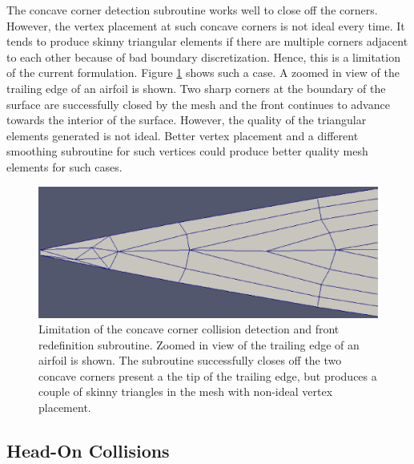 The concave corner detection subroutine  works well to close off the corners. However, the vertex placement at such concave corners is not ideal every time. It tends to produce skinny triangular elements if there are multiple corners adjacent to each other because of bad boundary discretization. Hence, this is a limitation of the current formulation. Figure \ref{fig-cornerLimitation} shows such a case. A zoomed in view of the trailing edge of an airfoil is shown. Two sharp corners at the boundary of the surface are successfully closed by the mesh and the front continues to advance towards the interior of the surface. However, the quality of the triangular elements generated is not ideal. Better vertex placement and a different smoothing subroutine for such vertices could produce better quality mesh elements for such cases.

\begin{figure}
\centering
\includegraphics[width=0.4\linewidth]{img/m2/cornerCollision/cornerLimitation.eps}
\caption{Limitation of the concave corner collision detection and front redefinition subroutine. Zoomed in view of the trailing edge of an airfoil is shown. The subroutine successfully closes off the two concave corners present a the tip of the trailing edge, but produces a couple of skinny triangles in the mesh with non-ideal vertex placement.}
\label{fig-cornerLimitation}
\end{figure}

\subsection{Head-On Collisions}

